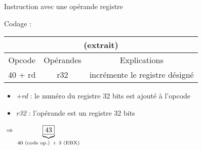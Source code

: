 \documentclass[14pt,xcolor,table]{beamer}
\begin{document}
\begin{frame}[fragile]{Instruction avec une opérande registre}

	Codage : \emph{}
	
	\medskip
	
	\begin{center}
	\begin{small}
	\begin{tabular}{|c|c|c|}
		\multicolumn{3}{c}{\asm{INC} (extrait)}\\\hline
		{\cellcolor{gray!25}Opcode} & {\cellcolor{gray!25}Opérandes} & {\cellcolor{gray!25}Explications} \\\hline
		40 + rd & r32 & incrémente le registre désigné \\\hline
	\end{tabular}
	\end{small}
	\end{center}
	
	\begin{itemize}
	\item \emph{+rd} : le numéro du registre 32 bits est ajouté à l'opcode
	\item \emph{r32} : l'opérande est un registre 32 bits
	\end{itemize}	
	
	\begin{center}
			$\Longrightarrow$ 
			$\underbrace{\fbox{43}}_{\text{40 (code op.) + 3 (EBX)}}$
	\end{center}
	
\end{frame}
\end{document}
